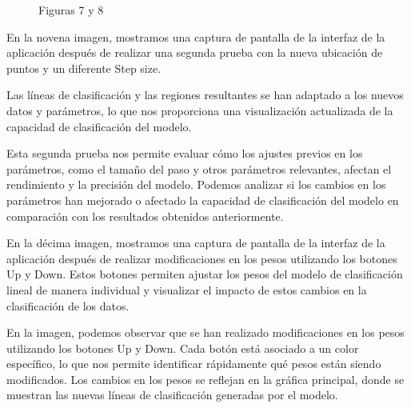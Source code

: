 \documentclass[twoside,10pt]{article}
\numberwithin{equation}{section}
\begin{document}
\begin{figure}[ht]
    \centering
    \hspace{1cm}
    \caption{Figuras 7 y 8}
\end{figure}

En la novena imagen, mostramos una captura de pantalla de la interfaz de la aplicación después de realizar una segunda prueba con la nueva ubicación de puntos y un diferente Step size.

 Las líneas de clasificación y las regiones resultantes se han adaptado a los nuevos datos y parámetros, lo que nos proporciona una visualización actualizada de la capacidad de clasificación del modelo.

 Esta segunda prueba nos permite evaluar cómo los ajustes previos en los parámetros, como el tamaño del paso y otros parámetros relevantes, afectan el rendimiento y la precisión del modelo. Podemos analizar si los cambios en los parámetros han mejorado o afectado la capacidad de clasificación del modelo en comparación con los resultados obtenidos anteriormente.



En la décima imagen, mostramos una captura de pantalla de la interfaz de la aplicación después de realizar modificaciones en los pesos utilizando los botones Up y Down. Estos botones permiten ajustar los pesos del modelo de clasificación lineal de manera individual y visualizar el impacto de estos cambios en la clasificación de los datos.

En la imagen, podemos observar que se han realizado modificaciones en los pesos utilizando los botones Up y Down. Cada botón está asociado a un color específico, lo que nos permite identificar rápidamente qué pesos están siendo modificados. Los cambios en los pesos se reflejan en la gráfica principal, donde se muestran las nuevas líneas de clasificación generadas por el modelo.
\end{document}
